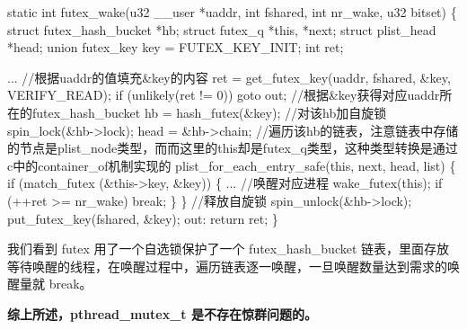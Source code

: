 \begin{DoxyCode}
\textcolor{keyword}{static} \textcolor{keywordtype}{int} futex\_wake(u32 \_\_user *uaddr, \textcolor{keywordtype}{int} fshared, \textcolor{keywordtype}{int} nr\_wake, u32 bitset)
\{
    \textcolor{keyword}{struct }futex\_hash\_bucket *hb;
    \textcolor{keyword}{struct }futex\_q *\textcolor{keyword}{this}, *next;
    \textcolor{keyword}{struct }plist\_head *head;
    \textcolor{keyword}{union }futex\_key key = FUTEX\_KEY\_INIT;
    \textcolor{keywordtype}{int} ret;

    ...
    \textcolor{comment}{//根据uaddr的值填充&key的内容}
    ret = get\_futex\_key(uaddr, fshared, &key, VERIFY\_READ);
    \textcolor{keywordflow}{if} (unlikely(ret != 0))
        \textcolor{keywordflow}{goto} out;
    \textcolor{comment}{//根据&key获得对应uaddr所在的futex\_hash\_bucket}
    hb = hash\_futex(&key);
    \textcolor{comment}{//对该hb加自旋锁}
    spin\_lock(&hb->lock);
    head = &hb->chain;
    \textcolor{comment}{//遍历该hb的链表，注意链表中存储的节点是plist\_node类型，而而这里的this却是futex\_q类型，这种类型转换是通过c中的container\_of机制实现的}
    plist\_for\_each\_entry\_safe(\textcolor{keyword}{this}, next, head, list) \{
        \textcolor{keywordflow}{if} (match\_futex (&this->key, &key)) \{
            ...
            \textcolor{comment}{//唤醒对应进程}
            wake\_futex(\textcolor{keyword}{this});
            \textcolor{keywordflow}{if} (++ret >= nr\_wake)
                \textcolor{keywordflow}{break};
        \}
    \}
    \textcolor{comment}{//释放自旋锁}
    spin\_unlock(&hb->lock);
    put\_futex\_key(fshared, &key);
out:
    \textcolor{keywordflow}{return} ret;
\}
\end{DoxyCode}


我们看到 futex 用了一个自选锁保护了一个 futex\+\_\+hash\+\_\+bucket 链表，里面存放等待唤醒的线程，在唤醒过程中，遍历链表逐一唤醒，一旦唤醒数量达到需求的唤醒量就 break。

{\bfseries 综上所述，pthread\+\_\+mutex\+\_\+t 是不存在惊群问题的。} 